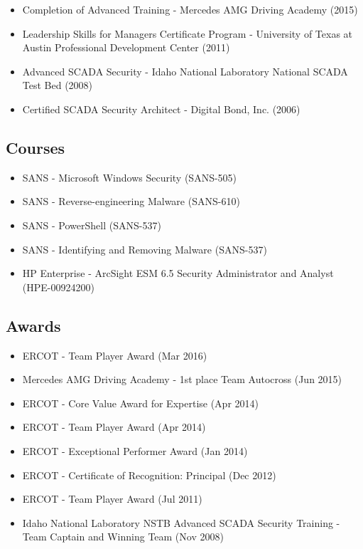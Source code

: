 \documentclass[10pt,]{article}
\providecommand{\tightlist}{%
  \setlength{\itemsep}{0pt}\setlength{\parskip}{0pt}}
\begin{document}
\begin{itemize}
\tightlist
\item
  Completion of Advanced Training - Mercedes AMG Driving Academy (2015)
\item
  Leadership Skills for Managers Certificate Program - University of
  Texas at Austin Professional Development Center (2011)
\item
  Advanced SCADA Security - Idaho National Laboratory National SCADA
  Test Bed (2008)
\item
  Certified SCADA Security Architect - Digital Bond, Inc. (2006)
\end{itemize}

\subsection{Courses}\label{courses}

\begin{itemize}
\tightlist
\item
  SANS - Microsoft Windows Security (SANS-505)
\item
  SANS - Reverse-engineering Malware (SANS-610)
\item
  SANS - PowerShell (SANS-537)
\item
  SANS - Identifying and Removing Malware (SANS-537)
\item
  HP Enterprise - ArcSight ESM 6.5 Security Administrator and Analyst
  (HPE-00924200)
\end{itemize}

\subsection{Awards}\label{awards}

\begin{itemize}
\tightlist
\item
  ERCOT - Team Player Award (Mar 2016)
\item
  Mercedes AMG Driving Academy - 1st place Team Autocross (Jun 2015)
\item
  ERCOT - Core Value Award for Expertise (Apr 2014)
\item
  ERCOT - Team Player Award (Apr 2014)
\item
  ERCOT - Exceptional Performer Award (Jan 2014)
\item
  ERCOT - Certificate of Recognition: Principal (Dec 2012)
\item
  ERCOT - Team Player Award (Jul 2011)
\item
  Idaho National Laboratory NSTB Advanced SCADA Security Training - Team
  Captain and Winning Team (Nov 2008)
\end{itemize}
\end{document}
